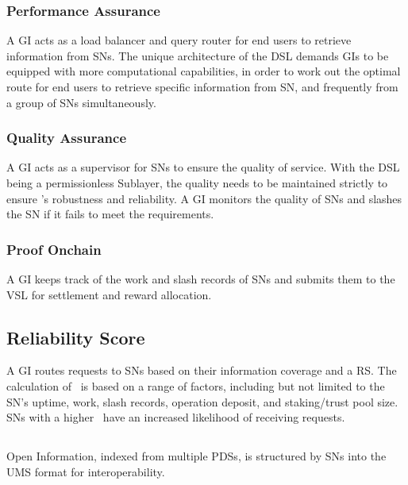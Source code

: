 \subsubsection{Performance Assurance} A GI acts as a load balancer and query router for end users to retrieve information from \glspl{SN}.
The unique architecture of the \gls{DSL} demands \glspl{GI} to be equipped with more computational capabilities, in order to work out the optimal route for end users to retrieve specific information from \gls{SN}, and frequently from a group of \glspl{SN} simultaneously.

\subsubsection{Quality Assurance} A GI acts as a supervisor for \glspl{SN} to ensure the quality of service.
With the \gls{DSL} being a permissionless Sublayer, the quality needs to be maintained strictly to ensure 's robustness and reliability.
A \gls{GI} monitors the quality of \glspl{SN} and slashes the \gls{SN} if it fails to meet the requirements.

\subsubsection{Proof Onchain} A GI keeps track of the work and slash records of \glspl{SN} and submits them to the \gls{VSL} for settlement and reward allocation.

\subsection{Reliability Score} 

A \gls{GI} routes requests to \glspl{SN} based on their information coverage and a \gls{RS}.
The calculation of \reliabilityScore\ is based on a range of factors, including but not limited to the \gls{SN}'s uptime, work, slash records, operation deposit, and staking/trust pool size.
\glspl{SN} with a higher \reliabilityScore\ have an increased likelihood of receiving requests.

\subsection{}
\label{subsec:UMS}

Open Information, indexed from multiple \glspl{PDS}, is structured by \glspl{SN} into the \gls{UMS} format for interoperability.

